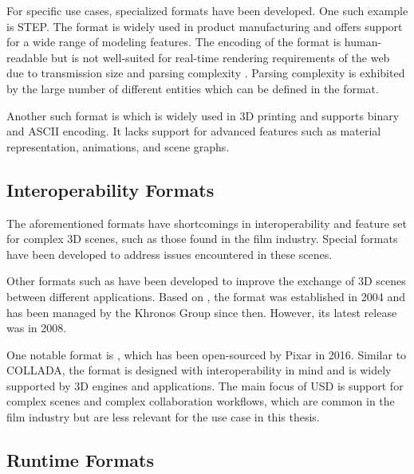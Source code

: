 For specific use cases, specialized formats have been developed. One such example is \gls{STEP}. The format is widely used in product manufacturing and offers support for a wide range of modeling features. The  encoding of the format is human-readable but is not well-suited for real-time rendering requirements of the web due to transmission size and parsing complexity \cite{marjudi2010StepIgesreview}. Parsing complexity is exhibited by the large number of different entities which can be defined in the format.

Another such format is  which is widely used in 3D printing and supports binary and \gls{ASCII} encoding. It lacks support for advanced features such as material representation, animations, and scene graphs.

\subsection*{Interoperability Formats}

The aforementioned formats have shortcomings in interoperability and feature set for complex 3D scenes, such as those found in the film industry. Special formats have been developed to address issues encountered in these scenes.

Other formats such as  have been developed to improve the exchange of 3D scenes between different applications. Based on , the format was established in 2004 and has been managed by the \gls{Khronos Group} since then. However, its latest release was in 2008.

One notable format is , which has been open-sourced by Pixar in 2016. Similar to \gls{COLLADA}, the format is designed with interoperability in mind and is widely supported by 3D engines and applications. The main focus of \gls{USD} is support for complex scenes and complex collaboration workflows, which are common in the film industry but are less relevant for the use case in this thesis.

\subsection*{Runtime Formats}

